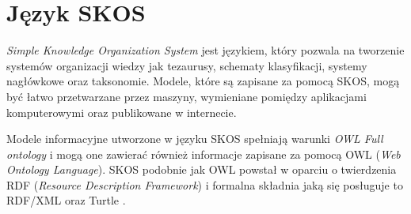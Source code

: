 \section{Język SKOS}
\emph{Simple Knowledge Organization System} jest językiem, który pozwala na
tworzenie systemów organizacji wiedzy jak tezaurusy, schematy klasyfikacji,
systemy nagłówkowe oraz taksonomie. Modele, które są zapisane za pomocą SKOS,
mogą być łatwo przetwarzane przez maszyny, wymieniane pomiędzy aplikacjami
komputerowymi oraz publikowane w internecie.

Modele informacyjne utworzone w języku SKOS spełniają warunki 
\emph{OWL Full ontology} i mogą one zawierać również informacje zapisane za
pomocą OWL (\emph{Web Ontology Language}). SKOS podobnie jak OWL powstał w
oparciu o twierdzenia RDF (\emph{Resource Description Framework}) i formalna 
składnia jaką się posługuje to RDF/XML oraz Turtle \cite{SKOS-ref}. 

